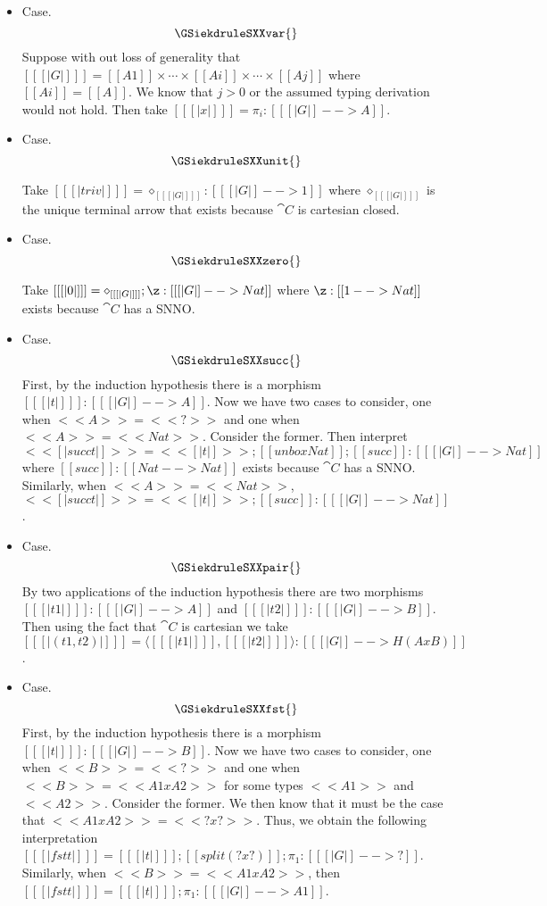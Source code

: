   \begin{itemize} 
  \item[] Case.
    \[
    \GSiekdruleSXXvar{}
    \]
    Suppose with out loss of generality that $[[ [| G |] ]] = [[A1]]
    \times \cdots \times [[Ai]] \times \cdots \times [[Aj]]$ where
    $[[Ai]] = [[A]]$.  We know that $j > 0$ or the assumed typing
    derivation would not hold.  Then take
    $[[ [| x |] ]] = \pi_i : [[ [| G |] --> A]]$.

  \item[] Case.
    \[
    \GSiekdruleSXXunit{}
    \]

    Take $[[ [| triv |] ]] = \diamond_{[[ [| G |] ]]} : [[ [| G |] -->
        1 ]]$ where $\diamond_{[[ [| G |] ]]}$ is the unique terminal
    arrow that exists because $\cat{C}$ is cartesian closed.
    
  \item[] Case.
    \[
    \GSiekdruleSXXzero{}
    \]

    Take $[[ [| 0 |] ]] = \diamond_{[[ [| G |] ]]};\z : [[ [| G |] --> Nat]]$
    where $\z : [[1 --> Nat]]$ exists because $\cat{C}$
    has a SNNO.

  \item[] Case.
    \[
    \GSiekdruleSXXsucc{}
    \]
    First, by the induction hypothesis there is a morphism $[[ [| t |] ]] : [[ [| G |] --> A]]$.
    Now we have two cases to consider, one when $<<A>> = <<?>>$ and one when $<<A>> = <<Nat>>$.
    Consider the former.  Then interpret
    $<< [| succ t |] >> = << [| t |] >>;[[ unbox Nat ]];[[succ]] : [[ [| G |] --> Nat]]$ where
    $[[succ]] : [[Nat --> Nat]]$ exists because $\cat{C}$ has a SNNO.  Similarly,
    when $<<A>> = <<Nat>>$, 
    $<< [| succ t |] >> = << [| t |] >>;[[succ]] : [[ [| G |] --> Nat]]$.
    
  \item[] Case.
    \[
    \GSiekdruleSXXpair{}
    \]
    By two applications of the induction hypothesis there are two morphisms
    $[[ [| t1 |] ]] : [[ [| G |] --> A]]$ and $[[ [| t2 |] ]] : [[ [| G |] --> B]]$.
    Then using the fact that $\cat{C}$ is cartesian we take
    $[[ [| (t1 , t2) |] ]] = \langle [[ [| t1 |] ]] , [[ [| t2 |] ]] \rangle : [[ [| G |] --> H(A x B)]]$.

  \item[] Case.
    \[
    \GSiekdruleSXXfst{}
    \]
    First, by the induction hypothesis there is a morphism $[[ [| t |] ]] : [[ [| G |] --> B]]$.
    Now we have two cases to consider, one when $<<B>> = <<?>>$ and one when $<<B>> = <<A1 x A2>>$
    for some types $<<A1>>$ and $<<A2>>$.  Consider the former.  We then know that it must
    be the case that $<<A1 x A2>> = <<? x ?>>$.  Thus, we obtain the following interpretation
    $[[ [| fst t |] ]] = [[ [| t |] ]];[[split (? x ?)]];\pi_1 : [[ [| G |] --> ?]]$.  Similarly,
    when $<<B>> = <<A1 x A2>>$, then
    $[[ [| fst t |] ]] = [[ [| t |] ]];\pi_1 : [[ [| G |] --> A1]]$.


\end{itemize}

